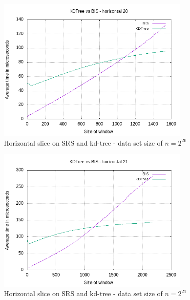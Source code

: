\begin{figure}[h]
    \centering
    \includegraphics[width = 0.85\textwidth]{pictures/analysis/hori_20.png}
    \caption{Horizontal slice on SRS and kd-tree - data set size of $n=2^{20}$}\label{fig:hori_20}
\end{figure}

\begin{figure}[h]
    \centering
    \includegraphics[width = 0.85\textwidth]{pictures/analysis/hori_21.png}
    \caption{Horizontal slice on SRS and kd-tree - data set size of $n=2^{21}$}\label{fig:hori_21}
\end{figure}


